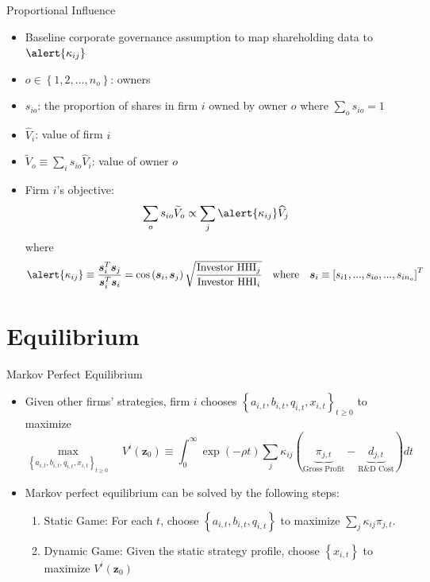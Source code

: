 \documentclass[
  10pt,
  aspectratio=169,   %
]{beamer}
\theoremstyle{plain}
\begin{document}
\begin{frame}{Proportional Influence \citep{Rotemberg1984-jz} }
  \label{rotemberg}
  \begin{itemize}
    \item Baseline corporate governance assumption to map shareholding data to $\alert{\kappa_{ij}}$ \pause
    \item $o\in\left\{ 1,2,...,n_{o}\right\} $: owners \pause
    \item $s_{io}$: the proportion of shares in firm $i$ owned by owner $o$ where $\sum_{o}s_{io}=1$ \pause
    \item $\widehat{V}_{i}$: value of firm $i$
    \item $\widetilde{V}_{o}\equiv\sum_{i}s_{io}\widehat{V}_{i}$: value of owner $o$ \pause
    \item Firm $i$'s objective:
          \[
            \sum_{o}s_{io}\widetilde{V}_{o}\propto\sum_{j}\alert{\kappa_{ij}}\widehat{V}_{j}
          \] \pause
          where
          \[
            \alert{\kappa_{ij}}\equiv\frac{\bm{s}_{i}^{T}\bm{s}_{j}}{\bm{s}_{i}^{T}\bm{s}_{i}} = \cos\left( \bm{s}_{i}, \bm{s}_{j} \right)\sqrt{\frac{\text{Investor HHI}_j}{\text{Investor HHI}_i}}
            \quad \text{where} \quad \bm{s}_{i}\equiv\left[s_{i1},...,s_{io},...,s_{in_{o}}\right]^{T}
          \]
  \end{itemize}
\end{frame}

\section{Equilibrium}

\begin{frame}{Markov Perfect Equilibrium}
  \begin{itemize}
    \item Given other firms' strategies, firm $i$ chooses $\left\{a_{i,t}, b_{i,t}, q_{i,t}, x_{i,t}\right\}_{t\geq0}$ to maximize
          \[
            \max_{\left\{a_{i,t}, b_{i,t}, q_{i,t}, x_{i,t}\right\}_{t\geq0}}\quad V^{i}\left(\bm{z}_{0}\right)\equiv\int_{0}^{\infty}\exp\left(-\rho t\right) \sum_{j}\kappa_{ij}\left(\underbrace{\pi_{j,t}}_{\text{Gross Profit}}-\underbrace{d_{j,t}}_{\text{R\&D Cost}}\right) dt
          \] \pause
    \item Markov perfect equilibrium can be solved by the following steps:
          \medskip{}
          \begin{enumerate}
            \item \alert{Static Game:} For each $t$, choose $\left\{a_{i,t}, b_{i,t}, q_{i,t}\right\}$ to maximize $\sum_{j} \kappa_{ij} \pi_{j,t}$.
                  \medskip{}
            \item \alert{Dynamic Game:} Given the static strategy profile, choose $\left\{x_{i,t}\right\}$ to maximize $V^{i}\left(\bm{z}_{0}\right)$
          \end{enumerate}
  \end{itemize}
\end{frame}
\end{document}
